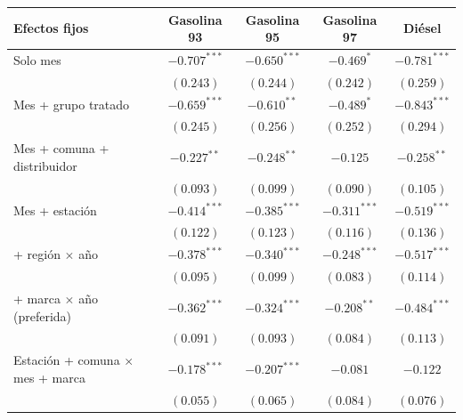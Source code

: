 \small
\setlength{\tabcolsep}{5pt}
\begin{tabular}{lcccc}
\toprule
Efectos fijos & Gasolina 93 & Gasolina 95 & Gasolina 97 & Diésel \\
\midrule
Solo mes & $-0.707^{***}$ & $-0.650^{***}$ & $-0.469^{*}$ & $-0.781^{***}$ \\
 & $(0.243)$ & $(0.244)$ & $(0.242)$ & $(0.259)$ \\
\addlinespace
Mes + grupo tratado & $-0.659^{***}$ & $-0.610^{**}$ & $-0.489^{*}$ & $-0.843^{***}$ \\
 & $(0.245)$ & $(0.256)$ & $(0.252)$ & $(0.294)$ \\
\addlinespace
Mes + comuna + distribuidor & $-0.227^{**}$ & $-0.248^{**}$ & $-0.125$ & $-0.258^{**}$ \\
 & $(0.093)$ & $(0.099)$ & $(0.090)$ & $(0.105)$ \\
\addlinespace
Mes + estación & $-0.414^{***}$ & $-0.385^{***}$ & $-0.311^{***}$ & $-0.519^{***}$ \\
 & $(0.122)$ & $(0.123)$ & $(0.116)$ & $(0.136)$ \\
\addlinespace
\quad + región $\times$ año & $-0.378^{***}$ & $-0.340^{***}$ & $-0.248^{***}$ & $-0.517^{***}$ \\
 & $(0.095)$ & $(0.099)$ & $(0.083)$ & $(0.114)$ \\
\addlinespace
\quad + marca $\times$ año (preferida) & $-0.362^{***}$ & $-0.324^{***}$ & $-0.208^{**}$ & $-0.484^{***}$ \\
 & $(0.091)$ & $(0.093)$ & $(0.084)$ & $(0.113)$ \\
\addlinespace
Estación + comuna $\times$ mes + marca & $-0.178^{***}$ & $-0.207^{***}$ & $-0.081$ & $-0.122$ \\
 & $(0.055)$ & $(0.065)$ & $(0.084)$ & $(0.076)$ \\
\bottomrule
\end{tabular}
